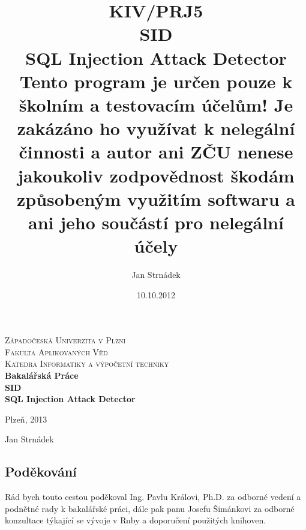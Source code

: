 \documentclass[12pt, a4paper]{report}
\begin{document}
\author{Jan Strnádek}
\date{10.10.2012}
\title{KIV/PRJ5\\SID\\\small{SQL Injection Attack Detector\\Tento program je určen pouze k školním a testovacím účelům! Je zakázáno ho využívat k nelegální činnosti a autor ani ZČU nenese jakoukoliv zodpovědnost škodám způsobeným využitím softwaru a ani jeho součástí pro nelegální účely}}
\begin{titlepage}
\begin{center}
\textsc{\Large Západočeská Univerzita v Plzni}
\\[0.3cm]
\textsc{\Large Fakulta Aplikovaných Věd}
\\[0.3cm]
\textsc{\Large Katedra Informatiky a výpočetní techniky}
\\[6cm]
\textbf{\LARGE Bakalářská Práce}
\\[3cm]
\textbf{\LARGE SID\\[0.3cm] SQL Injection Attack Detector}
\\[6cm]
\begin{minipage}{0.4\textwidth}
\begin{flushleft}
\large
Plzeň, 2013
\end{flushleft}
\end{minipage}
\begin{minipage}{0.4\textwidth}
\begin{flushright} 
Jan Strnádek
\end{flushright}
\end{minipage}
\vfill
\end{center}
\end{titlepage}
\tableofcontents
\newpage
\thispagestyle{empty}
\subsection*{Poděkování}
Rád bych touto cestou poděkoval Ing. Pavlu Královi, Ph.D. za odborné vedení a podnětné rady k bakalářské práci, dále pak panu Josefu Šimánkovi za odborné konzultace týkající se vývoje v Ruby a doporučení použitých knihoven.
\\[9cm]
\end{document}
